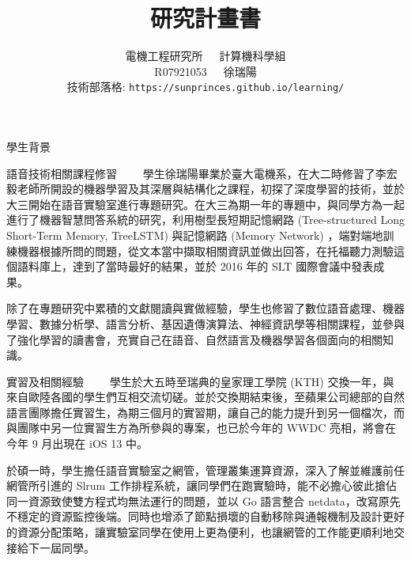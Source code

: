 \documentclass[12pt]{extarticle}
\title{研究計畫書}
\author{電機工程研究所~~~計算機科學組\\R07921053~~~徐瑞陽 \\ 技術部落格: \texttt{https://sunprinces.github.io/learning/}}
\date{}
\begin{document}
\maketitle

\begin{section}{學生背景}
  \begin{subsection}{語音技術相關課程修習}
~~~~學生徐瑞陽畢業於臺大電機系，在大二時修習了李宏毅老師所開設的機器學習及其深層與結構化之課程，初探了深度學習的技術，並於大三開始在語音實驗室進行專題研究。在大三為期一年的專題中，與同學方為一起進行了機器智慧問答系統的研究，利用樹型長短期記憶網路 (Tree-structured Long Short-Term Memory, TreeLSTM) 與記憶網路 (Memory Network) ，端對端地訓練機器根據所問的問題，從文本當中擷取相關資訊並做出回答，在托福聽力測驗這個語料庫上，達到了當時最好的結果，並於 2016 年的 SLT 國際會議中發表成果。

    除了在專題研究中累積的文獻閱讀與實做經驗，學生也修習了數位語音處理、機器學習、數據分析學、語言分析、基因遺傳演算法、神經資訊學等相關課程，並參與了強化學習的讀書會，充實自己在語音、自然語言及機器學習各個面向的相關知識。
  \end{subsection}

  \begin{subsection}{實習及相關經驗}
    ~~~~學生於大五時至瑞典的皇家理工學院 (KTH) 交換一年，與來自歐陸各國的學生們互相交流切磋。並於交換期結束後，至蘋果公司總部的自然語言團隊擔任實習生，為期三個月的實習期，讓自己的能力提升到另一個檔次，而與團隊中另一位實習生方為所參與的專案，也已於今年的 WWDC 亮相，將會在今年 9 月出現在 iOS 13 中。

    於碩一時，學生擔任語音實驗室之網管，管理叢集運算資源，深入了解並維護前任網管所引進的 Slrum 工作排程系統，讓同學們在跑實驗時，能不必擔心彼此搶佔同一資源致使雙方程式均無法運行的問題，並以 Go 語言整合 netdata，改寫原先不穩定的資源監控後端。同時也增添了節點損壞的自動移除與通報機制及設計更好的資源分配策略，讓實驗室同學在使用上更為便利，也讓網管的工作能更順利地交接給下一屆同學。
  \end{subsection}
\end{section}
\end{document}
